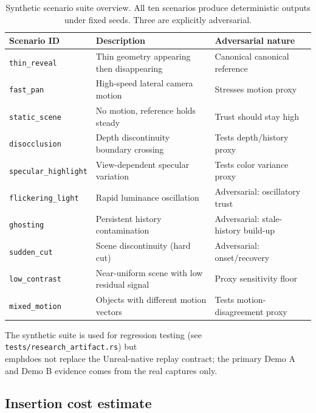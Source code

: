 \documentclass[11pt]{article}
\theoremstyle{definition}
\theoremstyle{plain}
\begin{document}
\begin{table}[H]
\centering
\caption{Synthetic scenario suite overview. All ten scenarios produce deterministic outputs under fixed seeds. Three are explicitly adversarial.}
\label{tab:scenario-suite}
\small
\begin{tabular}{>{\raggedright\arraybackslash}p{3.0cm} >{\raggedright\arraybackslash}p{5.5cm} >{\raggedright\arraybackslash}p{4.0cm}}
\toprule
Scenario ID & Description & Adversarial nature \\
\midrule
\texttt{thin\_reveal} & Thin geometry appearing then disappearing & Canonical canonical reference \\
\texttt{fast\_pan} & High-speed lateral camera motion & Stresses motion proxy \\
\texttt{static\_scene} & No motion, reference holds steady & Trust should stay high \\
\texttt{disocclusion} & Depth discontinuity boundary crossing & Tests depth/history proxy \\
\texttt{specular\_highlight} & View-dependent specular variation & Tests color variance proxy \\
\texttt{flickering\_light} & Rapid luminance oscillation & Adversarial: oscillatory trust \\
\texttt{ghosting} & Persistent history contamination & Adversarial: stale-history build-up \\
\texttt{sudden\_cut} & Scene discontinuity (hard cut) & Adversarial: onset/recovery \\
\texttt{low\_contrast} & Near-uniform scene with low residual signal & Proxy sensitivity floor \\
\texttt{mixed\_motion} & Objects with different motion vectors & Tests motion-disagreement proxy \\
\bottomrule
\end{tabular}
\end{table}

The synthetic suite is used for regression testing (see \texttt{tests/research\_artifact.rs}) but \\emph{does not replace} the Unreal-native replay contract; the primary Demo A and Demo B evidence comes from the real captures only.

\subsection{Insertion cost estimate}
\label{sec:insertion-cost}
\end{document}

